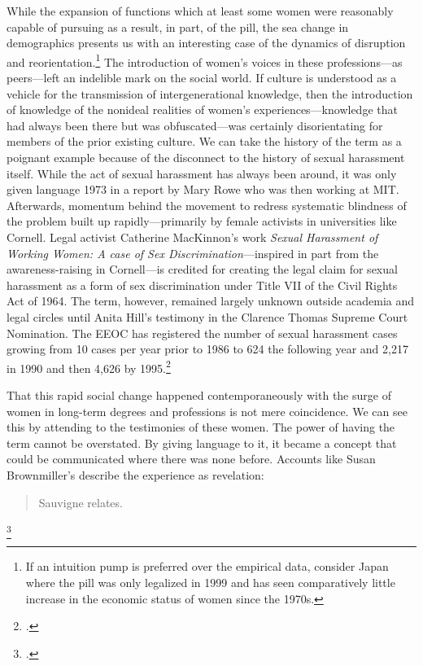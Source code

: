 \documentclass[letterpaper,notitlepage,12pt]{article}
\begin{document}
While the expansion of functions which at least some women were reasonably
capable of pursuing as a result, in part, of the pill, the sea change in
demographics presents us with an interesting case of the dynamics of disruption
and reorientation.\footnote{If an intuition pump is preferred over the empirical
  data, consider Japan where the pill was only legalized in 1999 and has seen
  comparatively little increase in the economic status of women since the
1970s.}
The introduction of women's voices in these professions---as peers---left an
indelible mark on the social world.
If culture is understood as a vehicle for the transmission of intergenerational
knowledge, then the introduction of knowledge of the nonideal realities of
women's experiences---knowledge that had always been there but was
obfuscated---was certainly disorientating for members of the prior existing
culture.
We can take the history of the term  as a poignant
example because of the disconnect to the history of sexual harassment itself.
While the act of sexual harassment has always been around, it was only given
language 1973 in a report  by Mary Rowe who was then
working at MIT.
Afterwards, momentum behind the movement to redress systematic blindness of the
problem built up rapidly---primarily by female activists in universities like
Cornell.
Legal activist Catherine MacKinnon's work \textit{Sexual Harassment of Working
Women: A case of Sex Discrimination}---inspired in part from the
awareness-raising in Cornell---is credited for creating the legal claim for
sexual harassment as a form of sex discrimination under Title VII of the Civil
Rights Act of 1964.
The term, however, remained largely unknown outside academia and legal circles
until Anita Hill's testimony in the Clarence Thomas Supreme Court Nomination.
The EEOC has registered the number of sexual harassment cases growing from 10
cases per year prior to 1986 to 624 the following year and 2,217 in 1990 and
then 4,626 by 1995.\footcite{cochran_sexual_2004}

That this rapid social change happened contemporaneously with the surge of women
in long-term degrees and professions is not mere coincidence.
We can see this by attending to the testimonies of these women.
The power of having the term  cannot be overstated.
By giving language to it, it became a concept that could be communicated where
there was none before.
Accounts like Susan Brownmiller's describe the experience as revelation:
\blockquote{ Sauvigne relates.
  }\footcite[p. 281]{brownmiller_our_1999}
\end{document}
